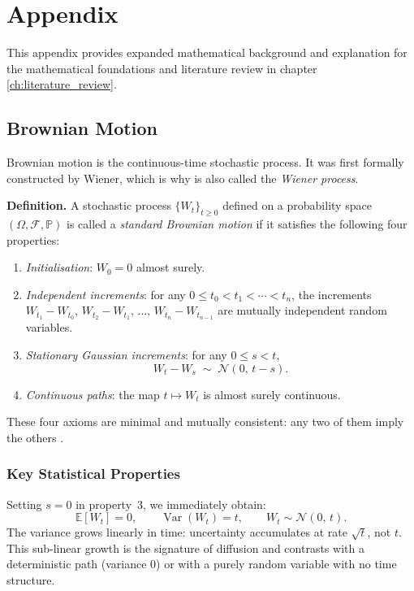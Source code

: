 \chapter{Appendix}
\label{app:math_foundations}

This appendix provides expanded mathematical background and explanation for the mathematical foundations and literature review in chapter \ref{ch:literature_review}.

\section{Brownian Motion}
\label{app:sec:bm}

Brownian motion is the continuous-time stochastic process. It was first formally constructed by Wiener, which is why is also called the \textit{Wiener process}.

\textbf{Definition.} A stochastic process $\{W_t\}_{t \geq 0}$ defined on a
probability space $(\Omega, \mathcal{F}, \mathbb{P})$ is called a
\textit{standard Brownian motion} if it satisfies the following four properties:
\begin{enumerate}
    \item \textit{Initialisation}: $W_0 = 0$ almost surely.
    \item \textit{Independent increments}: for any $0 \leq t_0 < t_1 < \cdots <
    t_n$, the increments $W_{t_1} - W_{t_0},\, W_{t_2} - W_{t_1},\, \ldots,\,
    W_{t_n} - W_{t_{n-1}}$ are mutually independent random variables.
    \item \textit{Stationary Gaussian increments}: for any $0 \leq s < t$,
    \[
        \label{eq:bm_increment}
        W_t - W_s \;\sim\; \mathcal{N}(0,\, t - s).
    \]
    \item \textit{Continuous paths}: the map $t \mapsto W_t$ is almost surely
    continuous.
\end{enumerate}

These four axioms are minimal and mutually consistent: any two of them imply the others \cite{oksendal2003stochastic}.

\subsection{Key Statistical Properties}

Setting $s = 0$ in property~3, we immediately obtain:
\[
    \mathbb{E}[W_t] = 0, \qquad \operatorname{Var}(W_t) = t, \qquad
    W_t \sim \mathcal{N}(0,\, t).
\]
The variance grows linearly in time: uncertainty accumulates at rate $\sqrt{t}$,
not $t$. This sub-linear growth is the signature of diffusion and contrasts with
a deterministic path (variance 0) or with a purely random variable with no time structure.

